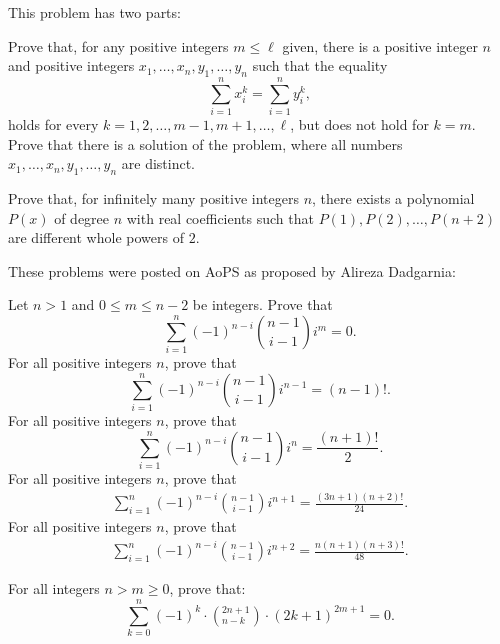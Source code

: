 \documentclass[12pt,a4paper]{memoir}
\theoremstyle{definition}
\begin{document}
\begin{question}[name={2011 Ibero American}]
	This problem has two parts:
	\begin{tasks}
		\task Prove that, for any positive integers $m\le \ell$ given, there is a positive integer $n$ and positive integers $x_1,\dots,x_n,y_1,\dots,y_n$ such that the equality \[ \sum_{i=1}^nx_i^k=\sum_{i=1}^ny_i^k,\] holds for every $k=1,2,\dots,m-1,m+1,\dots,\ell$, but does not hold for $k=m$.
		\task Prove that there is a solution of the problem, where all numbers $x_1,\dots,x_n,y_1,\dots,y_n$ are distinct.
	\end{tasks}
\end{question}




\begin{question}[name={Komal}]
	Prove that, for infinitely many positive integers $n$, there exists a polynomial $P(x)$ of degree $n$ with real coefficients such that $P(1), P(2), \dots, P(n+2)$ are different whole powers of $2$.
\end{question}


\begin{question}[name={Dadgarnia Finite Difference Identities}]
	These problems were posted on AoPS as proposed by Alireza Dadgarnia:
	\begin{tasks}
			\task Let $n>1$ and $0\leq m\leq n-2$ be integers. Prove that
			$$\sum_{i=1}^{n}(-1)^{n-i}\binom{n-1}{i-1}i^m=0.$$
			\task For all positive integers $n$, prove that
			$$\sum_{i=1}^{n}(-1)^{n-i}\binom{n-1}{i-1}i^{n-1}=(n-1)!.$$
			\task For all positive integers $n$, prove that
			$$\sum_{i=1}^{n}(-1)^{n-i}\binom{n-1}{i-1}i^{n}=\frac{(n+1)!}{2}.$$
			\task For all positive integers $n$, prove that
			\begin{align*}
				\sum_{i=1}^{n}(-1)^{n-i}\binom{n-1}{i-1}i^{n+1} = \frac{(3n+1)(n+2)!}{24}.
			\end{align*}
		\task For all positive integers $n$, prove that
		\begin{align*}
			\sum_{i=1}^{n}(-1)^{n-i}\binom{n-1}{i-1}i^{n+2} = \frac{n(n+1)(n+3)!}{48}.
		\end{align*}
	\end{tasks}
\end{question}


\begin{question}[name={Crux, by Max A. Alekseyev}]
	For all integers $n>m\geq 0$, prove that: \[\sum_{k=0}^{n}\left(-1\right)^{k}\cdotp\left(_{n-k}^{2n+1}\right)\cdotp\left(2k+1\right)^{2m+1}=0.\]
\end{question}
\end{document}
